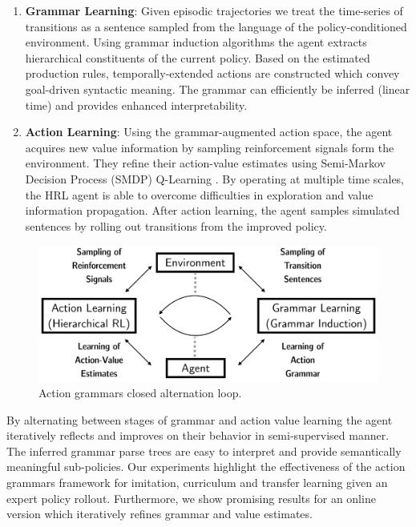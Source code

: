 \documentclass[10pt,letterpaper]{article}
\begin{document}
\begin{enumerate}
	\item \textbf{Grammar Learning}: Given episodic trajectories we treat the time-series of transitions as a sentence sampled from the language of the policy-conditioned environment. Using grammar induction algorithms \cite{Manning_1997} the agent extracts hierarchical constituents of the current policy. Based on the estimated production rules, temporally-extended actions are constructed which convey goal-driven syntactic meaning. The grammar can efficiently be inferred (linear time) and provides enhanced interpretability.
	\item \textbf{Action Learning}: Using the grammar-augmented action space, the agent acquires new value information by sampling reinforcement signals form the environment. They refine their action-value estimates using Semi-Markov Decision Process (SMDP) Q-Learning \cite{Bradtke_1995}. By operating at multiple time scales, the HRL agent is able to overcome difficulties in exploration and value information propagation. After action learning, the agent samples simulated sentences by rolling out transitions from the improved policy.
\end{enumerate}

\begin{figure}
    \centering
    \includegraphics[width=\linewidth]{figures/concept_al_gl.png}
    \caption{Action grammars closed alternation loop.}
    \label{fig:loop_ag}
\end{figure}

By alternating between stages of grammar and action value learning the agent iteratively reflects and improves on their behavior in semi-supervised manner. The inferred grammar parse trees are easy to interpret and provide semantically meaningful sub-policies.
Our experiments highlight the effectiveness of the action grammars framework for imitation, curriculum and transfer learning given an expert policy rollout. Furthermore, we show promising results for an online version which iteratively refines grammar and value estimates. 
\end{document}
